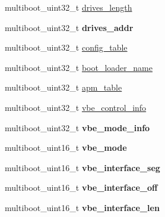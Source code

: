 \begin{DoxyCompactItemize}
\item 
multiboot\-\_\-uint32\-\_\-t \hyperlink{structmultiboot__info_abe859eaa7e97309f072b3bc1caf5742e}{drives\-\_\-length}
\item 
\hypertarget{structmultiboot__info_a34d90ffaaf58124095cb17de9c3b1515}{multiboot\-\_\-uint32\-\_\-t {\bfseries drives\-\_\-addr}}\label{structmultiboot__info_a34d90ffaaf58124095cb17de9c3b1515}

\item 
multiboot\-\_\-uint32\-\_\-t \hyperlink{structmultiboot__info_a919ce01f85d05ab90857f8591dfb3948}{config\-\_\-table}
\item 
multiboot\-\_\-uint32\-\_\-t \hyperlink{structmultiboot__info_a4442438f7c2da9c0cf87a94ffd1acc04}{boot\-\_\-loader\-\_\-name}
\item 
multiboot\-\_\-uint32\-\_\-t \hyperlink{structmultiboot__info_ad4285d60142d241a9e6b68a03e62ee0a}{apm\-\_\-table}
\item 
multiboot\-\_\-uint32\-\_\-t \hyperlink{structmultiboot__info_a06191cef73b64e9d64a01850547fd2e8}{vbe\-\_\-control\-\_\-info}
\item 
\hypertarget{structmultiboot__info_a88f574fe1adbcb5ff63fc95b2e072b4c}{multiboot\-\_\-uint32\-\_\-t {\bfseries vbe\-\_\-mode\-\_\-info}}\label{structmultiboot__info_a88f574fe1adbcb5ff63fc95b2e072b4c}

\item 
\hypertarget{structmultiboot__info_ac7653182e52bddb7e437cc8a66d74ce5}{multiboot\-\_\-uint16\-\_\-t {\bfseries vbe\-\_\-mode}}\label{structmultiboot__info_ac7653182e52bddb7e437cc8a66d74ce5}

\item 
\hypertarget{structmultiboot__info_a204c99787efd58c0f54fe1e056b1d69f}{multiboot\-\_\-uint16\-\_\-t {\bfseries vbe\-\_\-interface\-\_\-seg}}\label{structmultiboot__info_a204c99787efd58c0f54fe1e056b1d69f}

\item 
\hypertarget{structmultiboot__info_a1621d51b1cc198a1496e9f61b3708291}{multiboot\-\_\-uint16\-\_\-t {\bfseries vbe\-\_\-interface\-\_\-off}}\label{structmultiboot__info_a1621d51b1cc198a1496e9f61b3708291}

\item 
\hypertarget{structmultiboot__info_ab3c537df524db1ed0aeaa2e6f61a23e6}{multiboot\-\_\-uint16\-\_\-t {\bfseries vbe\-\_\-interface\-\_\-len}}\label{structmultiboot__info_ab3c537df524db1ed0aeaa2e6f61a23e6}

\end{DoxyCompactItemize}


